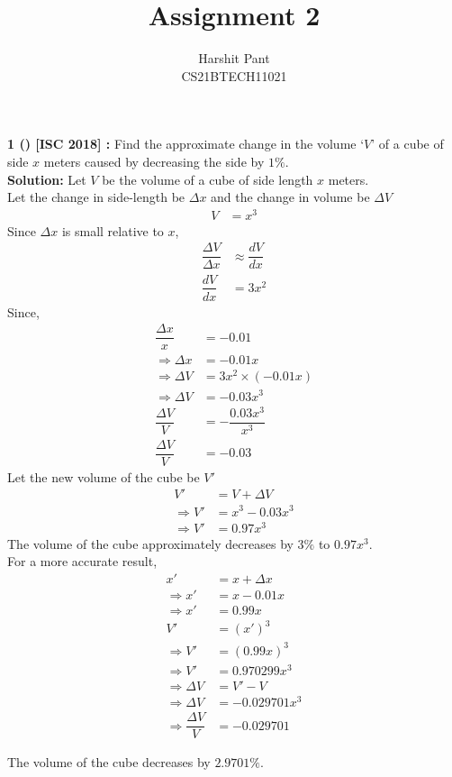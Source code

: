 \documentclass[journal,12pt,twocolumn]{IEEEtran}
\title{Assignment 2}
\author{Harshit Pant\\CS21BTECH11021}
\date{}
\begin{document}
\maketitle
\textbf{1 () [ISC 2018] :}
Find the approximate change in the volume `$V$' of a cube of side $x$ meters caused by decreasing the side by $1\%$.\\

\textbf{Solution:} Let $V$ be the volume of a cube of side length $x$ meters.\\
Let the change in side-length be $\Delta x$ and the change in volume be $\Delta V$
\begin{align}
V&=x^3
\end{align}
Since $\Delta x$ is small relative to $x$,
\addtolength{\jot}{.1in}
\begin{align}
\dfrac{\Delta V}{\Delta x}&\approx\dfrac{dV}{dx}\\
\dfrac{dV}{dx}&=3x^2
\end{align}
Since,
\begin{align}
\dfrac{\Delta x}{x}&=-0.01\\
\Rightarrow\Delta x&=-0.01x\\
\Rightarrow\Delta V&=3x^2\times(-0.01x)\\
\Rightarrow\Delta V&=-0.03x^3\\
\dfrac{\Delta V}{V}&=-\dfrac{0.03x^3}{x^3}\\
\dfrac{\Delta V}{V}&=-0.03
\end{align}
Let the new volume of the cube be $V'$
\begin{align}
V'&=V+\Delta V\\
\Rightarrow V'&=x^3-0.03x^3\\
\Rightarrow V'&=0.97x^3
\end{align}
The volume of the cube approximately decreases by $3\%$  to $0.97x^3$.\\

For a more accurate result,
\begin{align}
x'&=x+\Delta x\\
\Rightarrow x'&=x-0.01x\\
\Rightarrow x'&=0.99x\\
V'&=(x')^3\\
\Rightarrow V'&=(0.99x)^3\\
\Rightarrow V'&=0.970299x^3\\
\Rightarrow \Delta V&=V'-V\\
\Rightarrow \Delta V&=-0.029701x^3\\
\Rightarrow \dfrac{\Delta V}{V}&=-0.029701
\end{align}

The volume of the cube decreases by $2.9701\%$.
\end{document}
